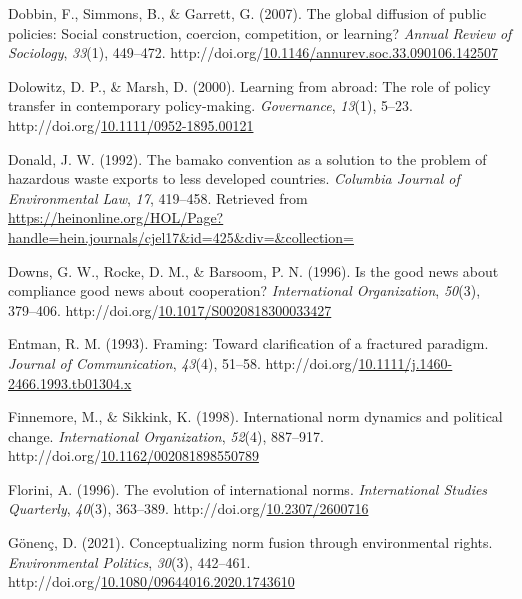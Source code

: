 \documentclass[12pt]{ulaval}
\newenvironment{CSLReferences}%
  {}%
  {\par}
\begin{document}
\begin{CSLReferences}{1}{0}
Dobbin, F., Simmons, B., \& Garrett, G. (2007). The global diffusion of public policies: Social construction, coercion, competition, or learning? \emph{Annual Review of Sociology}, \emph{33}(1), 449--472. http://doi.org/\href{https://doi.org/10.1146/annurev.soc.33.090106.142507}{10.1146/annurev.soc.33.090106.142507}

Dolowitz, D. P., \& Marsh, D. (2000). Learning from abroad: The role of policy transfer in contemporary policy-making. \emph{Governance}, \emph{13}(1), 5--23. http://doi.org/\href{https://doi.org/10.1111/0952-1895.00121}{10.1111/0952-1895.00121}

Donald, J. W. (1992). The bamako convention as a solution to the problem of hazardous waste exports to less developed countries. \emph{Columbia Journal of Environmental Law}, \emph{17}, 419--458. Retrieved from \url{https://heinonline.org/HOL/Page?handle=hein.journals/cjel17&id=425&div=&collection=}

Downs, G. W., Rocke, D. M., \& Barsoom, P. N. (1996). Is the good news about compliance good news about cooperation? \emph{International Organization}, \emph{50}(3), 379--406. http://doi.org/\href{https://doi.org/10.1017/S0020818300033427}{10.1017/S0020818300033427}

Entman, R. M. (1993). Framing: Toward clarification of a fractured paradigm. \emph{Journal of Communication}, \emph{43}(4), 51--58. http://doi.org/\href{https://doi.org/10.1111/j.1460-2466.1993.tb01304.x}{10.1111/j.1460-2466.1993.tb01304.x}

Finnemore, M., \& Sikkink, K. (1998). International norm dynamics and political change. \emph{International Organization}, \emph{52}(4), 887--917. http://doi.org/\href{https://doi.org/10.1162/002081898550789}{10.1162/002081898550789}

Florini, A. (1996). The evolution of international norms. \emph{International Studies Quarterly}, \emph{40}(3), 363--389. http://doi.org/\href{https://doi.org/10.2307/2600716}{10.2307/2600716}

Gönenç, D. (2021). Conceptualizing norm fusion through environmental rights. \emph{Environmental Politics}, \emph{30}(3), 442--461. http://doi.org/\href{https://doi.org/10.1080/09644016.2020.1743610}{10.1080/09644016.2020.1743610}


\end{CSLReferences}
\end{document}
